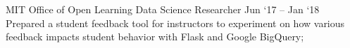 \experience
    {MIT Office of Open Learning}
    {Data Science Researcher}
    {Jun `17 -- Jan `18}
    {
        Prepared a student feedback tool for instructors to experiment on how various feedback
        impacts student behavior with Flask and Google BigQuery;
    }
